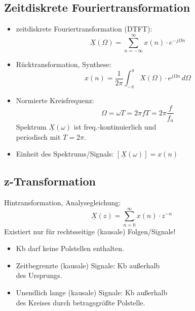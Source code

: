 \begin{multicols*}{2}
\subsection{Zeitdiskrete Fouriertransformation}
\begin{itemize}
\item zeitdiskrete Fouriertransformation (DTFT):
\[ \boxed{
\underline{X}(\Omega) = \sum_{n=-\infty}^{\infty} x(n) \cdot e^{-j\Omega n}
}
\]
\item Rücktransformation, Synthese:
\[
x(n) = \frac{1}{2\pi}\int_{-\pi}^{\pi} X(\Omega) \cdot  e^{j\Omega n} \, d\Omega
\]
\item Normierte Kreisfrequenz:
\[ \boxed{
\Omega = \omega T = 2\pi f T = 2\pi \frac{f}{f_a} }
\]
{\small Spektrum $\underline{X}(\omega)$ ist freq.-kontinuierlich und\\ periodisch mit $T=2\pi$.}
\item Einheit des Spektrums/Signals: $[\underline{X}(\omega)] = x(n)$
\end{itemize}

\subsection{z-Transformation}
Hintransformation, Analysegleichung: 
\[\boxed{
	\underline{X}(z) = \sum_{n=0}^{\infty} x(n) \cdot z^{-n} }
\]
Existiert nur für rechtsseitige (kausale) Folgen/Signale!
\small
\begin{itemize}
	\item Kb darf keine Polstellen enthalten.
	\item Zeitbegrenzte (kausale) Signale: Kb außerhalb\\ des Ursprungs.
	\item Unendlich lange (kausale) Signale: Kb außerhalb\\ des Kreises durch betragsgrößte Polstelle.
\end{itemize}
\normalsize


\end{multicols*}
